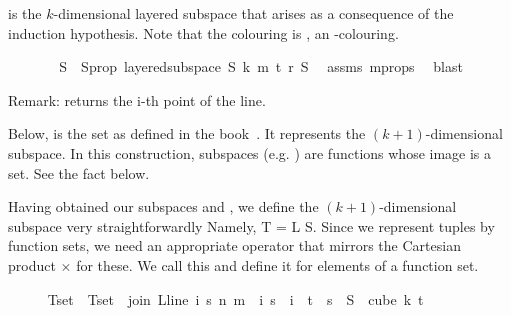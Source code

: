 \begin{isabellebody}
\begin{isamarkuptext}
 is the $k$-dimensional layered subspace that arises as a
    consequence of the induction hypothesis. Note that the colouring is , an
    -colouring.%
\end{isamarkuptext}\isamarkuptrue%
\ \ \ \ \isamarkupfalse%
\ \isamarkupfalse%
\ S\ \ S{\isacharunderscore}{\kern0pt}prop{\isacharcolon}{\kern0pt}\ {\isachardoublequoteopen}layered{\isacharunderscore}{\kern0pt}subspace\ S\ k\ m\ t\ r\ {\isasymchi}S{\isachardoublequoteclose}\ \isamarkupfalse%
\ assms{\isacharparenleft}{\kern0pt}{}{\isacharparenright}{\kern0pt}\ m{\isacharunderscore}{\kern0pt}props\ \isamarkupfalse%
\ blast%
\begin{isamarkuptext}%
Remark:  returns the i-th point of the line.%
\end{isamarkuptext}\isamarkuptrue%
%
\endisatagproof
{\isafoldproof}%
%
\isadelimproof
%
\endisadelimproof
%
\isadelimdocument
%
\endisadelimdocument
%
\isatagdocument
%
\isamarkuptrue%
%
\begin{isamarkuptext}%
Below,  is the set as defined in the book~\cite{thebook}. It
    represents the $(k+1)$-dimensional subspace. In this construction, subspaces (e.g.
    ) are functions whose image is a set. See the fact 
    below.%
\end{isamarkuptext}\isamarkuptrue%
%
\begin{isamarkuptext}%
Having obtained our subspaces  and , we define the
    $(k+1)$-dimensional subspace very straightforwardly Namely, T = L \times S. Since we represent
    tuples by function sets, we need an appropriate operator that mirrors the Cartesian product
    $\times$ for these. We call this  and define it for elements of a function
    set.%
\end{isamarkuptext}\isamarkuptrue%
%
\endisatagdocument
{\isafolddocument}%
%
\isadelimdocument
%
\endisadelimdocument
%
\isadelimproof
\ \ \ \ %
\endisadelimproof
%
\isatagproof
{}\isamarkupfalse%
\ Tset\ \ {\isachardoublequoteopen}Tset\ {\isasymequiv}\ {\isacharbraceleft}{\kern0pt}join\ {\isacharparenleft}{\kern0pt}L{\isacharunderscore}{\kern0pt}line\ i{\isacharparenright}{\kern0pt}\ s\ n\ m\ {\isacharbar}{\kern0pt}\ i\ s\ {\isachardot}{\kern0pt}\ i\ {\isasymin}\ {\isacharbraceleft}{\kern0pt}{\isachardot}{\kern0pt}{\isachardot}{\kern0pt}{\isacharless}{\kern0pt}t{\isacharplus}{\kern0pt}{}{\isacharbraceright}{\kern0pt}\ {\isasymand}\ s\ {\isasymin}\ S\ {\isacharbackquote}{\kern0pt}\ {\isacharparenleft}{\kern0pt}cube\ k\ {\isacharparenleft}{\kern0pt}t{\isacharplus}{\kern0pt}{}{\isacharparenright}{\kern0pt}{\isacharparenright}{\kern0pt}{\isacharbraceright}{\kern0pt}{\isachardoublequoteclose}\isanewline

\end{isabellebody}
